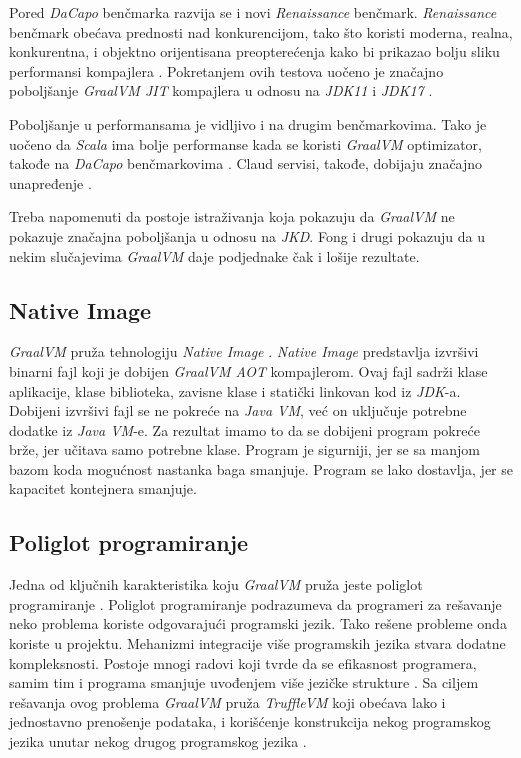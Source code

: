 \documentclass[a4paper]{article}
\begin{document}
Pored \emph{DaCapo} benčmarka razvija se i novi \emph{Renaissance} benčmark. \emph{Renaissance} benčmark obećava prednosti nad konkurencijom, tako što koristi moderna, realna, konkurentna, i objektno orijentisana preopterećenja kako bi prikazao bolju sliku performansi kompajlera \cite{prokopec19}. Pokretanjem ovih testova uočeno je značajno poboljšanje \emph{GraalVM JIT} kompajlera u odnosu na \emph{JDK11} i \emph{JDK17} \cite{renaissance}.

Poboljšanje u performansama je vidljivo i na drugim benčmarkovima. Tako je uočeno da \emph{Scala} ima bolje performanse kada se koristi \emph{GraalVM} optimizator, takođe na \emph{DaCapo} benčmarkovima \cite{stadler13, dacapo}. Claud servisi, takođe, dobijaju značajno unapređenje \cite{sipek21}. 

Treba napomenuti da postoje istraživanja koja pokazuju da \emph{GraalVM} ne pokazuje značajna poboljšanja u odnosu na \emph{JKD}. Fong i drugi \cite{fong21} pokazuju da u nekim slučajevima \emph{GraalVM} daje podjednake čak i lošije rezultate. 

\subsection{Native Image}
\label{sub:nim}

\emph{GraalVM} pruža tehnologiju \emph{Native Image} \cite{graalvm}. \emph{Native Image} predstavlja izvršivi binarni fajl koji je dobijen \emph{GraalVM AOT} kompajlerom. Ovaj fajl sadrži klase aplikacije, klase biblioteka, zavisne klase i statički linkovan kod iz \emph{JDK}-a. Dobijeni izvršivi fajl se ne pokreće na \emph{Java VM}, već on uključuje potrebne dodatke iz \emph{Java VM}-e. Za rezultat imamo to da se dobijeni program pokreće brže, jer učitava samo potrebne klase. Program je sigurniji, jer se sa manjom bazom koda mogućnost nastanka baga smanjuje. Program se lako dostavlja, jer se kapacitet kontejnera smanjuje.

\subsection{Poliglot programiranje}
\label{sub:poliglot}

Jedna od ključnih karakteristika koju \emph{GraalVM} pruža jeste poliglot programiranje \cite{graalvm}. Poliglot programiranje podrazumeva da programeri za rešavanje neko problema koriste odgovarajući programski jezik. Tako rešene probleme onda koriste u projektu. Mehanizmi integracije više programskih jezika stvara dodatne kompleksnosti. Postoje mnogi radovi koji tvrde da se efikasnost programera, samim tim i programa smanjuje uvođenjem više jezičke strukture \cite{peterson21, hao20}. Sa ciljem rešavanja ovog problema \emph{GraalVM} pruža \emph{TruffleVM} koji obećava lako i jednostavno prenošenje podataka, i korišćenje konstrukcija nekog programskog jezika unutar nekog drugog programskog jezika \cite{grimmer15}.
\end{document}
